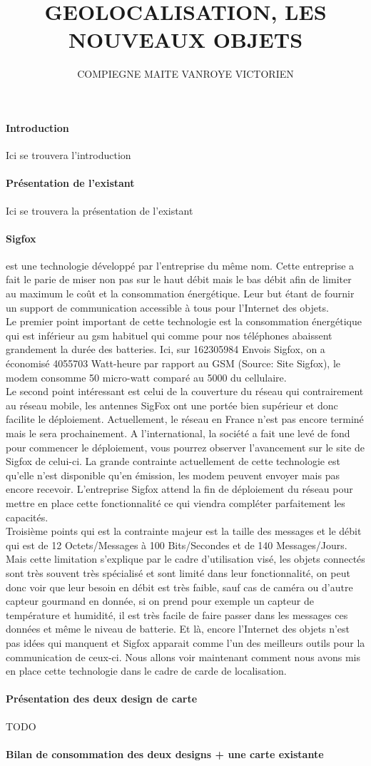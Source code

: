 \documentclass[10pt,a4paper]{article}
\author{COMPIEGNE MAITE VANROYE VICTORIEN}
\title{GEOLOCALISATION, LES NOUVEAUX OBJETS}
\begin{document}
\paragraph{Introduction}
Ici se trouvera l'introduction
\paragraph{Présentation de l'existant}
Ici se trouvera la présentation de l'existant
\paragraph{Sigfox}
est une technologie développé par l'entreprise du même nom. Cette entreprise a fait le parie de miser non pas sur le haut débit mais le bas débit afin de limiter au maximum le coût et la consommation énergétique. Leur but étant de fournir un support de communication accessible à tous pour l'Internet des objets.\\ Le premier point important de cette technologie est la consommation énergétique qui est inférieur au gsm habituel qui comme pour nos téléphones abaissent grandement la durée des batteries. Ici, sur 162305984 Envois Sigfox, on a économisé 4055703 Watt-heure par rapport au GSM (Source: Site Sigfox), le modem consomme 50 micro-watt comparé au 5000 du cellulaire. \\Le second point intéressant est celui de la couverture du réseau qui contrairement au réseau mobile, les antennes SigFox ont une portée bien supérieur et donc facilite le déploiement. Actuellement, le réseau en France n'est pas encore terminé mais le sera prochainement. A l'international, la société a fait une levé de fond pour commencer le déploiement, vous pourrez observer l'avancement sur le site de Sigfox de celui-ci. La grande contrainte actuellement de cette technologie est qu'elle n'est disponible qu'en émission, les modem peuvent envoyer mais pas encore recevoir. L'entreprise Sigfox attend la fin de déploiement du réseau pour mettre en place cette fonctionnalité ce qui viendra compléter parfaitement les capacités.\\Troisième points qui est la contrainte majeur est la taille des messages et le débit qui est de 12 Octets/Messages à 100 Bits/Secondes et de 140 Messages/Jours. Mais cette limitation s'explique par le cadre d'utilisation visé, les objets connectés sont très souvent très spécialisé et sont limité dans leur fonctionnalité, on peut donc voir que leur besoin en débit est très faible, sauf cas de caméra ou d'autre capteur gourmand en donnée, si on prend pour exemple un capteur de température et humidité, il est très facile de faire passer dans les messages ces données et même le niveau de batterie. Et là, encore l'Internet des objets n'est pas idées qui manquent et Sigfox apparait comme l'un des meilleurs outils pour la communication de ceux-ci. Nous allons voir maintenant comment nous avons mis en place cette technologie dans le cadre de carde de localisation.
\paragraph{Présentation des deux design de carte}
TODO
\paragraph{Bilan de consommation des deux designs + une carte existante}
\end{document}
